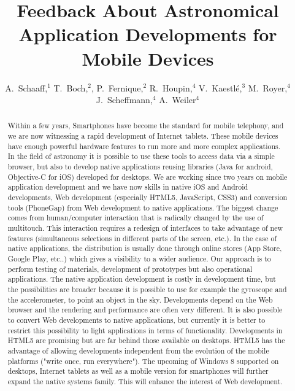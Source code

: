 
\resetcounters



\title{Feedback About Astronomical Application Developments for Mobile Devices}
\author{A.~Schaaff,$^1$ T.~Boch,$^2$, P.~Fernique,$^2$ R.~Houpin,$^4$ V.~Kaestl\'e,$^3$ M.~Royer,$^4$ J.~Scheffmann,$^4$ A.~Weiler$^4$
}


\begin{abstract}
Within a few years, Smartphones have become the standard for mobile telephony, and we are now witnessing a rapid development of Internet tablets. These mobile devices have enough powerful hardware features to run more and more complex applications. In the field of astronomy it is possible to use these tools to access data via a simple browser, but also to develop native applications reusing libraries (Java for android, Objective-C for iOS) developed for desktops. We are working since two years on mobile application development and we have now skills in native iOS and Android developments, Web development (especially HTML5, JavaScript, CSS3) and conversion tools (PhoneGap) from Web development to native applications. The biggest change comes from human/computer interaction that is radically changed by the use of multitouch. This interaction requires a redesign of interfaces to take advantage of new features (simultaneous selections in different parts of the screen, etc.). In the case of native applications, the distribution is usually done through online stores (App Store, Google Play, etc..) which gives a visibility to a wider audience. Our approach is to perform testing of materials, development of prototypes but also operational applications. The native application development is costly in development time, but the possibilities are broader because it is possible to use for example the gyroscope and the accelerometer, to point an object in the sky. Developments depend on the Web browser and the rendering and performance are often very different. It is also possible to convert Web developments to native applications, but currently it is better to restrict this possibility to light applications in terms of functionality. Developments in HTML5 are promising but are far behind those available on desktops. HTML5 has the advantage of allowing developments independent from the evolution of the mobile platforms ("write once, run everywhere"). The upcoming of Windows 8 supported on desktops, Internet tablets as well as a mobile version for smartphones will further expand the native systems family. This will enhance the interest of Web development.
\end{abstract}

